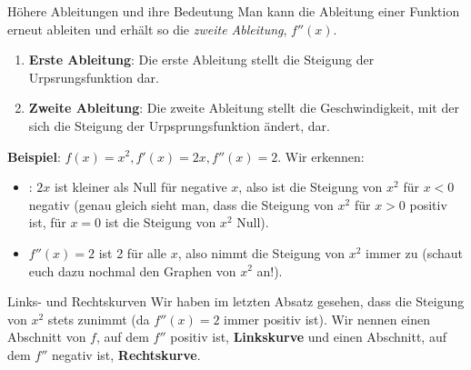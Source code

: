 \begin{bla}{Höhere Ableitungen und ihre Bedeutung}
  Man kann die Ableitung einer Funktion erneut ableiten und erhält so die \emph{zweite Ableitung}, $f''(x)$.
  \begin{enumerate}
    \item \textbf{Erste Ableitung}: Die erste Ableitung stellt die Steigung der Urpsrungsfunktion dar.
    \item \textbf{Zweite Ableitung}: Die zweite Ableitung stellt die Geschwindigkeit, mit der sich die Steigung der Urpsprungsfunktion ändert, dar.
  \end{enumerate}
	\clearpage
  \textbf{Beispiel}: $f(x)=x^2, f'(x)=2x, f''(x)=2$. Wir erkennen:
  \begin{itemize}
    \item: $2x$ ist kleiner als Null für negative $x$, also ist die Steigung von $x^2$ für $x<0$ negativ (genau gleich sieht man, dass die Steigung von $x^2$ für $x>0$ positiv ist, für $x=0$ ist die Steigung von $x^2$ Null).
    \item $f''(x)=2$ ist 2 für alle $x$, also nimmt die Steigung von $x^2$ immer zu (schaut euch dazu nochmal den Graphen von $x^2$ an!).
  \end{itemize}
\end{bla}

\begin{bla}{Links- und Rechtskurven}
  Wir haben im letzten Absatz gesehen, dass die Steigung von $x^2$ stets zunimmt (da $f''(x)=2$ immer positiv ist). Wir nennen einen Abschnitt von $f$, auf dem $f''$ positiv ist, \textbf{Linkskurve} und einen Abschnitt, auf dem $f''$ negativ ist, \textbf{Rechtskurve}.
\end{bla}

\begin{marginfigure}
  \caption{$f(x)=x^3$ ist vor $0$ eine Rechts- und danach eine Linkskurve. Ihr könnt euch vorstellen, dass ihr von $-\infty$ nach $\infty$ auf dem Graphen entlangfahrt.}
\end{marginfigure}
